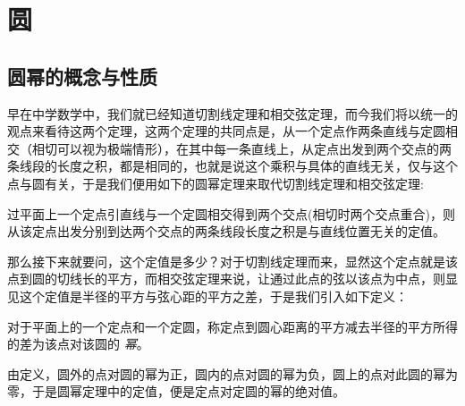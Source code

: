 
\section{圆}
\label{sec:circle}

\subsection{圆幂的概念与性质}
\label{sec:power-of-circle}

早在中学数学中，我们就已经知道切割线定理和相交弦定理，而今我们将以统一的观点来看待这两个定理，这两个定理的共同点是，从一个定点作两条直线与定圆相交（相切可以视为极端情形），在其中每一条直线上，从定点出发到两个交点的两条线段的长度之积，都是相同的，也就是说这个乘积与具体的直线无关，仅与这个点与圆有关，于是我们便用如下的圆幂定理来取代切割线定理和相交弦定理:

\begin{theorem}[圆幂定理]
  过平面上一个定点引直线与一个定圆相交得到两个交点(相切时两个交点重合)，则从该定点出发分别到达两个交点的两条线段长度之积是与直线位置无关的定值。
\end{theorem}

那么接下来就要问，这个定值是多少？对于切割线定理而来，显然这个定点就是该点到圆的切线长的平方，而相交弦定理来说，让通过此点的弦以该点为中点，则显见这个定值是半径的平方与弦心距的平方之差，于是我们引入如下定义：

\begin{definition}
  对于平面上的一个定点和一个定圆，称定点到圆心距离的平方减去半径的平方所得的差为该点对该圆的 \emph{幂}。
\end{definition}

由定义，圆外的点对圆的幂为正，圆内的点对圆的幂为负，圆上的点对此圆的幂为零，于是圆幂定理中的定值，便是定点对定圆的幂的绝对值。

